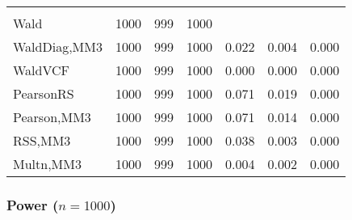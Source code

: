 \documentclass[
]{article}
\begin{document}
\begin{table}[H]
{\begin{tabular}[t]{lrrrrrr}
\addlinespace[0.3em]
\multicolumn{7}{l}{\textbf{3F 15V}}\\
\hspace{1em}Wald & 1000 & 999 & 1000 &  &  & \\
\hspace{1em}WaldDiag,MM3 & 1000 & 999 & 1000 & 0.022 & 0.004 & 0.000\\
\hspace{1em}WaldVCF & 1000 & 999 & 1000 & 0.000 & 0.000 & 0.000\\
\hspace{1em}PearsonRS & 1000 & 999 & 1000 & 0.071 & 0.019 & 0.000\\
\hspace{1em}Pearson,MM3 & 1000 & 999 & 1000 & 0.071 & 0.014 & 0.000\\
\hspace{1em}RSS,MM3 & 1000 & 999 & 1000 & 0.038 & 0.003 & 0.000\\
\hspace{1em}Multn,MM3 & 1000 & 999 & 1000 & 0.004 & 0.002 & 0.000\\
\bottomrule
\end{tabular}}
\endgroup{}
\end{table}

\hypertarget{power-n1000-2}{%
\subsubsection{\texorpdfstring{Power
(\(n=1000\))}{Power (n=1000)}}\label{power-n1000-2}}
\end{document}
